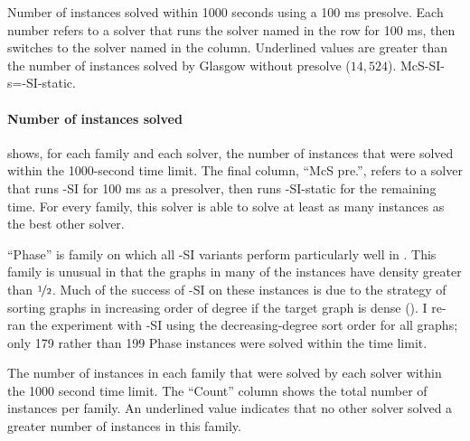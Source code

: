 \begin{table}[htb]
\centering
\footnotesize
    
\caption{Number of instances solved within 1000 seconds using a 100 ms presolve.  Each number
        refers to a solver that runs the solver named in the row for 100 ms, then switches to the
        solver named in the column.  Underlined values are greater than the number of instances
        solved by Glasgow without presolve ($14,524$). McS-SI-s=\McSplit-SI-static.}
\label{tab:si-decision-presolve-counts}
\end{table}

\paragraph*{Number of instances solved}
 shows, for each family and each solver,
the number of instances that were solved within the 1000-second time limit.
The final column, ``McS pre.'', refers to a solver that runs \McSplit-SI for 100 ms
as a presolver, then runs \McSplit-SI-static for the remaining time.  For every
family, this solver is able to solve at least as many instances as the best other
solver.

``Phase'' is family on which all \McSplit-SI variants perform particularly well in
.  This family is unusual in that the graphs
in many of the instances have density greater than $\nicefrac{1}{2}$.  
Much of the success of \McSplit-SI on these instances is due to the
strategy of sorting graphs in increasing order of degree if the target
graph is dense ().  I re-ran the experiment 
with \McSplit-SI using the decreasing-degree sort order for all graphs;
only 179 rather than 199 Phase instances were solved within the time limit.

\begin{table}[htb]
\centering
\footnotesize
    
\caption{The number of instances in each family that were solved by each solver
    within the 1000 second time limit.
    The ``Count'' column shows the total number of instances per family.
    An underlined value indicates that no other solver solved a greater number of instances
    in this family.}
\label{tab:si-decision-solved-counts}
\end{table}

